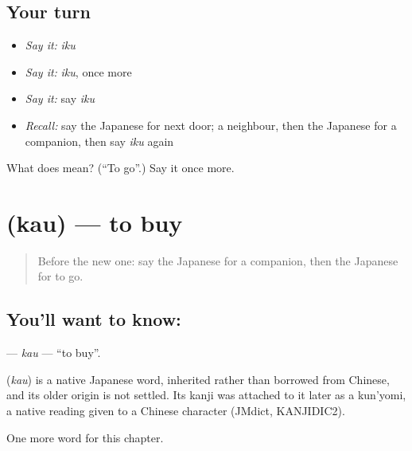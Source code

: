 \subsection*{Your turn}
\begin{itemize}
\raggedright
  \item \emph{Say it:} \emph{iku}
  \item \emph{Say it:} \emph{iku}, once more
  \item \emph{Say it:} say \emph{iku}
  \item \emph{Recall:} say the Japanese for next door; a neighbour, then the Japanese for a companion, then say \emph{iku} again
\end{itemize}

\begin{tcolorbox}[breakable,colback=teal!4,colframe=teal!35!black,title={Before you move on}]
What does  mean? (\textquotedblleft{}To go\textquotedblright{}.) Say it once more.
\end{tcolorbox}
\section[\texorpdfstring{\ja{かう} (kau)}{かう (kau)}]{ (kau) — to buy}

\label{lesson:JA-C26-kau}



\begin{quote}
Before the new one: say the Japanese for a companion, then the Japanese for to go.
\end{quote}

\subsection*{You'll want to know: }
\textbf{} — \emph{kau} — \textquotedblleft{}to buy\textquotedblright{}.

\begin{cousinweb}
\textbf{} (\emph{kau}) is a native Japanese word, inherited rather than borrowed from Chinese, and its older origin is not settled. Its kanji was attached to it later as a kun'yomi, a native reading given to a Chinese character (JMdict, KANJIDIC2).
\end{cousinweb}

\begin{grammarlens}[title={What you've built}]
One more word for this chapter.
\end{grammarlens}

